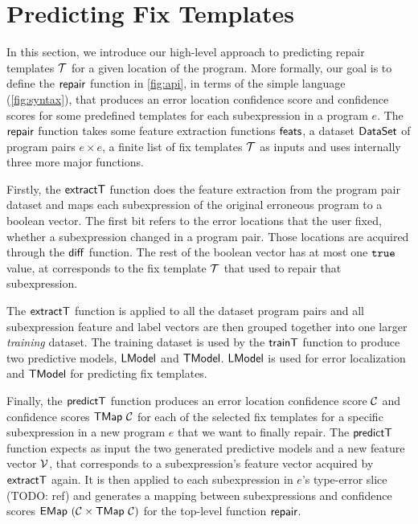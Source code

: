 \section{Predicting Fix Templates}
\label{sec:templ-pred}

In this section, we introduce our high-level approach to predicting repair
templates $\mathcal{T}$ for a given location of the program. More formally, our goal is
to define the $\mathsf{repair}$ function in \autoref{fig:api}, in terms of the simple
language \repairLang (\autoref{fig:syntax}), that produces an error location
confidence score and confidence scores for some predefined templates for each
subexpression in a program $e$. The $\mathsf{repair}$ function takes some feature
extraction functions $\mathsf{feats}$, a dataset $\mathsf{DataSet}$ of program pairs $e
\times e$, a finite list of fix templates $\mathcal{T}$ as inputs and uses internally
three more major functions.

Firstly, the $\mathsf{extractT}$ function does the feature extraction from the
program pair dataset and maps each subexpression of the original erroneous
program to a boolean vector. The first bit refers to the error locations that
the user fixed, \ie whether a subexpression changed in a program pair. Those
locations are acquired through the $\mathsf{diff}$ function. The rest of the boolean
vector has at most one $\mathtt{true}$ value, at corresponds to the fix template $\mathcal{T}$
that used to repair that subexpression.

The $\mathsf{extractT}$ function is applied to all the dataset program pairs and all
subexpression feature and label vectors are then grouped together into one
larger \emph{training} dataset. The training dataset is used by the $\mathsf{trainT}$
function to produce two predictive models, $\mathsf{LModel}$ and $\mathsf{TModel}$. $\mathsf{LModel}$ is
used for error localization and $\mathsf{TModel}$ for predicting fix templates.

Finally, the $\mathsf{predictT}$ function produces an error location confidence score
$\mathcal{C}$ and confidence scores $\mathsf{TMap}\ \mathcal{C}$ for each of the selected fix
templates for a specific subexpression in a new program $e$ that we want to
finally repair. The $\mathsf{predictT}$ function expects as input the two generated
predictive models and a new feature vector $\mathcal{V}$, that corresponds to a
subexpression's feature vector acquired by $\mathsf{extractT}$ again. It is then
applied to each subexpression in $e$'s type-error slice (TODO: ref) and
generates a mapping between subexpressions and confidence scores $\mathsf{EMap}\ (\mathcal{C}
\times \mathsf{TMap}\ \mathcal{C})$ for the top-level function $\mathsf{repair}$.

